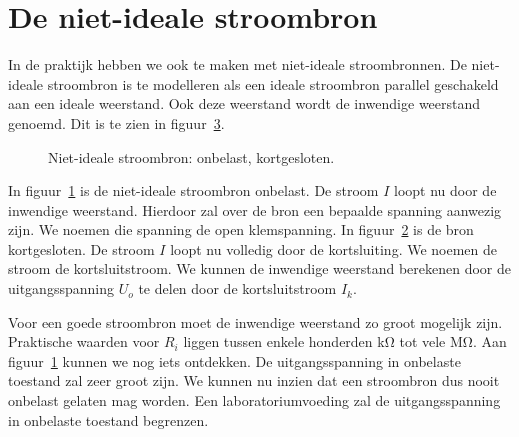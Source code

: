 \section{De niet-ideale stroombron}
\label{sec:gelnietidealestroombron}
In de praktijk hebben we ook te maken met niet-ideale stroombronnen. De niet-ideale
stroombron is te modelleren als een ideale stroombron parallel geschakeld aan een ideale
weerstand. Ook deze weerstand wordt de inwendige weerstand genoemd. Dit is te zien in
figuur~\ref{fig:gelnissopenkort}.

\begin{figure}[!ht]
\begin{subfigure}{0.5\textwidth}
\centering
{}
\caption{}
\label{fig:gelnissopen}
\end{subfigure}%
\begin{subfigure}{0.5\textwidth}
\centering
{}
\caption{}
\label{fig:gelnisskort}
\end{subfigure}
\caption{Niet-ideale stroombron:  onbelast,  kortgesloten.}
\label{fig:gelnissopenkort}
\end{figure}

In figuur~\ref{fig:gelnissopen} is de niet-ideale stroombron onbelast. De stroom $I$
loopt nu door de inwendige weerstand. Hierdoor zal over de bron een bepaalde spanning aanwezig
zijn. We noemen die spanning de open klemspanning. In figuur~\ref{fig:gelnisskort} is de bron
kortgesloten. De stroom $I$ loopt nu volledig door de kortsluiting. We noemen de stroom de
kortsluitstroom. We kunnen de inwendige
weerstand berekenen door de uitgangsspanning $U_o$ te delen door de kortsluitstroom $I_k$.

Voor een goede stroombron moet de inwendige weerstand zo groot mogelijk zijn. Praktische
waarden voor $R_i$ liggen tussen enkele honderden \si{\kilo\ohm} tot vele \si{\mega\ohm}. Aan
figuur~\ref{fig:gelnissopen} kunnen we nog iets ontdekken. De uitgangsspanning in onbelaste
toestand zal zeer groot zijn. We kunnen nu inzien dat een stroombron dus nooit onbelast gelaten
mag worden. Een laboratoriumvoeding zal de uitgangsspanning in onbelaste toestand begrenzen.

